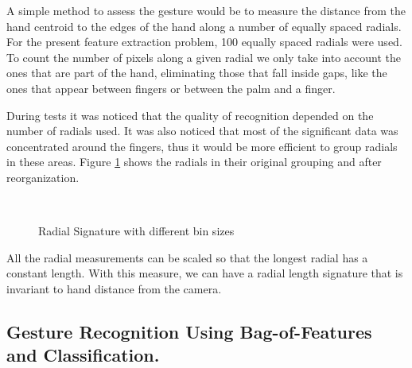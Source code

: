 A simple method to assess the gesture would be to measure the distance from the hand centroid to the edges of the hand along a number of equally spaced radials. For the present feature extraction problem, 100 equally spaced radials were used. To count the number of pixels along a given radial we only take into account the ones that are part of the hand, eliminating those that fall inside gaps, like the ones that appear between fingers or between the palm and a finger.
\bigskip

During tests it was noticed that the quality of recognition depended on the number of radials used. It was also noticed that most of the significant data was concentrated around the fingers, thus it would be more efficient to group radials in these areas. Figure \ref{fig:radial_bins} shows the radials in their original grouping and after reorganization.
\bigskip
\begin{figure}[h]
\begin{dBox}
\centering
  \mbox{
   }
   \caption{Radial Signature with different bin sizes\cite{feature4} \label{fig:radial_bins} }   
\end{dBox}   
\end{figure}

All the radial measurements can be scaled so that the longest radial has a constant length. With this measure, we can have a radial length signature that is invariant to hand distance from the camera.

\subsection{Gesture Recognition Using Bag-of-Features and Classification.}
